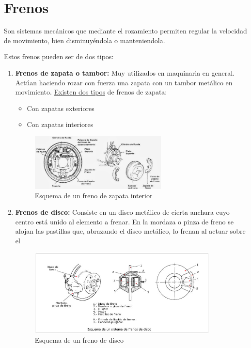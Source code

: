 \documentclass[a4paper,12pt,oneside]{book}
\begin{document}
\section{Frenos}
\label{sec:orgab5b4bd}

Son sistemas mecánicos que mediante el rozamiento permiten regular la velocidad
de movimiento, bien disminuyéndola o manteniendola.

Estos frenos pueden ser de dos tipos:
\begin{enumerate}
\item \textbf{Frenos de zapata o tambor:} Muy utilizados en maquinaria en general. Actúan haciendo
rozar con fuerza una zapata con un tambor metálico en movimiento. \uline{Existen
dos tipos} de frenos de zapata: 
\begin{itemize}
\item Con zapatas exteriores
\item Con zapatas interiores
\end{itemize}
\begin{figure}[htbp]
\centering
\includegraphics[width=0.65\textwidth]{./img_0009/freno_tambor.jpg}
\caption{Esquema de un freno de zapata interior}
\end{figure}
\item \textbf{Frenos de disco:} Consiste en un disco metálico de cierta anchura cuyo
centro está unido al elemento a frenar. En la mordaza o pinza de freno se
alojan las pastillas que, abrazando el disco metálico, lo frenan al actuar
sobre el

\begin{figure}[htbp]
\centering
\includegraphics[width=0.9\textwidth]{./img_0009/freno_disco.jpg}
\caption{Esquema de un freno de disco}
\end{figure}
\end{enumerate}
\end{document}
